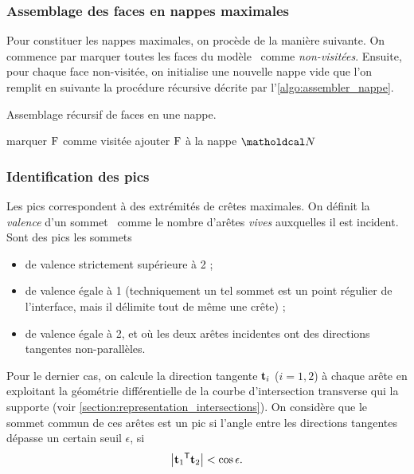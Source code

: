\subsubsection{Assemblage des faces en nappes maximales}
Pour constituer les nappes maximales, on procède de la manière suivante. 
On commence par marquer toutes les faces du modèle \brep\ comme \textit{non-visitées}. 
Ensuite, pour chaque face non-visitée, on initialise une nouvelle nappe vide que l'on remplit en suivante la procédure récursive décrite par l'\autoref{algo:assembler_nappe}.

\begin{algorithm}
	\caption{Assemblage récursif de faces en une nappe.}\label{algo:assembler_nappe}
	\begin{algorithmic}[1]
			\State marquer $\mathrm{F}$ comme visitée
			\State ajouter $\mathrm{F}$ à la nappe $\nappe$
						\State {}
					\EndIf
				\EndFor
			\EndFor
		\EndProcedure
	\end{algorithmic}
\end{algorithm}


\subsubsection{Identification des pics}
Les pics correspondent à des extrémités de crêtes maximales. 
On définit la \textit{valence} d'un sommet \brep\ comme le nombre d'arêtes \textit{vives} auxquelles il est incident. 
Sont des pics les sommets
\begin{itemize}
	\item de valence strictement supérieure à 2 ;
	\item de valence égale à 1 (techniquement un tel sommet est un point régulier de l'interface, mais il délimite tout de même une crête) ;
	\item de valence égale à 2, et où les deux arêtes incidentes ont des directions tangentes non-parallèles.
\end{itemize}

Pour le dernier cas, on calcule la direction tangente $\mathbf{t}_i$ ($i = 1,2$) à chaque arête en exploitant la géométrie différentielle de la courbe d'intersection transverse qui la supporte (voir \autoref{section:representation_intersections}). 
On considère que le sommet commun de ces arêtes est un pic si l'angle entre les directions tangentes dépasse un certain seuil $\epsilon$, \ie si 
\begin{equation}
	\left| {\mathbf{t}_1} ^\mathsf{T} {\mathbf{t}_2} \right| < \cos \epsilon.
\end{equation}



